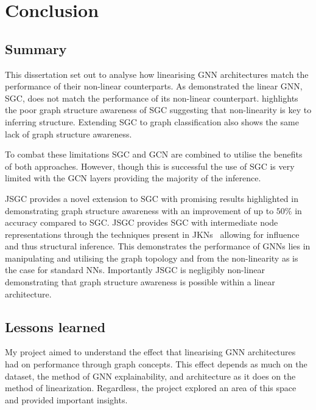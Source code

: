 \chapter{Conclusion}

\section{Summary}
This dissertation set out to analyse how linearising GNN architectures match the performance of their non-linear counterparts.
As  demonstrated the linear GNN, SGC, does not match the performance of its non-linear counterpart.
 highlights the poor graph structure awareness of SGC suggesting that non-linearity is key to inferring structure.
Extending SGC to graph classification also shows the same lack of graph structure awareness.

To combat these limitations SGC and GCN are combined to utilise the benefits of both approaches.
However, though this is successful the use of SGC is very limited with the GCN layers providing the majority of the inference.

JSGC provides a novel extension to SGC with promising results highlighted in  demonstrating graph structure awareness with an improvement of up to $50\%$ in accuracy compared to SGC.
JSGC provides SGC with intermediate node representations through the techniques present in JKNs~\cite{xu2018representation} allowing for influence and thus structural inference.
This demonstrates the performance of GNNs lies in manipulating and utilising the graph topology and from the non-linearity as is the case for standard NNs.
Importantly JSGC is negligibly non-linear demonstrating that graph structure awareness is possible within a linear architecture.

\section{Lessons learned}
My project aimed to understand the effect that linearising GNN architectures had on performance through graph concepts.
This effect depends as much on the dataset, the method of GNN explainability, and architecture as it does on the method of linearization.
Regardless, the project explored an area of this space and provided important insights.

